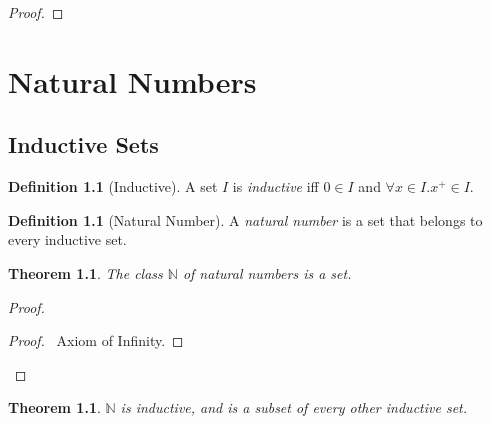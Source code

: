 \documentclass{book}
\let\qed\relax
\newtheorem{thm}[ax]{Theorem}
\theoremstyle{definition}
\newtheorem{df}[ax]{Definition}
\begin{document}
\begin{proof}
\pf
{}
\qed
\end{proof}

\chapter{Natural Numbers}

\section{Inductive Sets}

\begin{df}[Inductive]
A set $I$ is \emph{inductive} iff $0 \in I$ and $\forall x \in I. x^+ \in I$.
\end{df}

\begin{df}[Natural Number]
A \emph{natural number} is a set that belongs to every inductive set.
\end{df}

\begin{thm}
The class $\mathbb{N}$ of natural numbers is a set.
\end{thm}

\begin{proof}
\pf
{}
\begin{proof}
	\pf\ Axiom of Infinity.
\end{proof}
\qed
\end{proof}

\begin{thm}
$\mathbb{N}$ is inductive, and is a subset of every other inductive set.
\end{thm}
\end{document}
